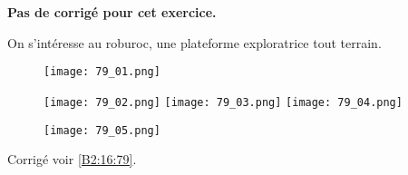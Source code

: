 \normaltrue \difficilefalse \tdifficilefalse
\correctionfalse

\setcounter{numques}{0}


\ifcorrection
\else
\textbf{Pas de corrigé pour cet exercice.}
\fi

On s'intéresse au roburoc, une plateforme exploratrice tout terrain.

\begin{figure}[H]
\centering
\texttt{[image: 79\_01.png]}
\end{figure} 

\begin{figure}[H]
\centering
\texttt{[image: 79\_02.png]}
\texttt{[image: 79\_03.png]}
\texttt{[image: 79\_04.png]}
\end{figure} 


\begin{figure}[H]
\centering
\texttt{[image: 79\_05.png]}
\end{figure} 




 

\ifprof
\else


\begin{flushright}
\footnotesize{Corrigé  voir \ref{B2:16:79}.}
\end{flushright}%
\fi